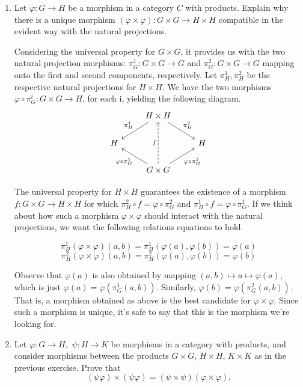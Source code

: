 \documentclass[12pt]{article}
\begin{document}
\begin{enumerate}
\item Let $ \varphi : G \to H $ be a morphism in a category $ C $ with products. Explain why there is a unique morphism $ (\varphi \times \varphi) : G \times G \to H \times H $ compatible in the evident way with the natural projections.

\begin{solution}
Considering the universal property for $ G \times G $, it provides us with the two natural projection morphisms: $ \pi^1_G : G \times G \to G $  and $ \pi^2_G : G \times G \to G $ mapping onto the first and second components, respectively. Let $ \pi^1_H, \pi^2_H $ be the respective natural projections for $ H \times H $. We have the two morphisms $ \varphi \circ \pi^i_G : G \times G \to H $, for each i, yielding the following diagram.
\[ \begin{tikzcd}
		& H \times H \arrow[dr, "\pi^2_H"] \arrow[dl, "\pi^1_H"'] 								& \\
	H 	& 				 																		& H \\
	  	& G \times G \arrow[ul, "\varphi \circ \pi^1_G"] \arrow[uu, dashed, "f"] \arrow[ur, "\varphi \circ \pi^2_G"'] 	&
\end{tikzcd}\]

The universal property for $ H \times H $ guarantees the existence of a morphism $ f : G \times G \to H \times H $ for which $ \pi^2_H \circ f = \varphi \circ \pi^2_G $ and $ \pi^1_H \circ f = \varphi \circ \pi^1_G $. If we think about how such a morphism $ \varphi \times \varphi $ should interact with the natural projections, we want the following relations equations to hold.

\[ \pi ^1_H ( \varphi \times \varphi)(a, b) = \pi^1_H (\varphi(a), \varphi(b)) = \varphi(a) \]
\[ \pi ^2_H ( \varphi \times \varphi)(a, b) = \pi^2_H (\varphi(a), \varphi(b)) = \varphi(b) \]

Observe that $ \varphi(a) $ is also obtained by mapping $ (a, b) \mapsto a \mapsto \varphi(a) $, which is just $ \varphi(a) = \varphi ( \pi^1_G(a, b)) $. Similarly, $ \varphi(b) = \varphi(\pi^2_G(a, b)) $. That is, a morphism obtained as above is the best candidate for $ \varphi \times \varphi $. Since such a morphism is unique, it's safe to say that this is the morphism we're looking for.

\end{solution}
\item Let $ \varphi : G \to H, $ $ \psi: H \to K $ be morphisms in a category with products, and consider morphisms between the products $ G \times G $, $ H \times H $, $ K \times K $ as in the previous exercise. Prove that
\[(\psi \varphi) \times (\psi \varphi) = (\psi \times \psi) (\varphi \times \varphi). \]


\end{enumerate}
\end{document}
